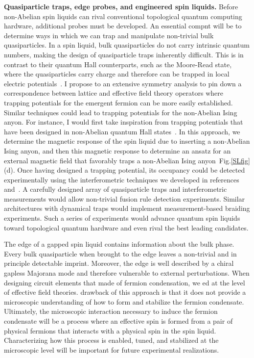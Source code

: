 \hfill \break
{\large \textbf{Quasiparticle traps, edge probes, and engineered spin liquids.}}
Before non-Abelian spin liquids can rival conventional topological quantum computing hardware, additional probes must be developed.
An essential compnt will be to determine ways in which we can trap and manipulate non-trivial bulk quasiparticles.
In a spin liquid, bulk quasiparticles do not carry intrinsic quantum numbers, 
making the design of quasiparticle traps inherently difficult. 
This is in contrast to their quantum Hall counterparts, such as the Moore-Read state, where the quasiparticles carry charge and therefore can be trapped in local electric potentials~\cite{Sarma2005,Bonderson2006}. 
I propose to  an extensive symmetry analysis to pin down a correspondence between lattice and effective field theory operators where trapping potentials for the emergent fermion can be more easily established.
Similar techniques could  lead to trapping potentials for the non-Abelian Ising anyon.
For instance, I would first take inspiration from trapping potentials that have been designed in non-Abelian quantum Hall states~\cite{Mong2017}. 
In this approach, we determine the magnetic response of the spin liquid due to inserting a non-Abelian Ising anyon, and then  this magnetic response to determine an ansatz for an external magnetic field that favorably traps a non-Abelian Ising anyon~Fig.\ref{SLfig}(d).
{Once having designed a trapping potential, its occupancy could be detected experimentally using the interferometric techniques we developed in references~\cite{Aasen20} and~\cite{Klocke2020}. A carefully designed array of quasiparticle traps and interferometric measurements would allow non-trivial fusion rule detection experiments. Similar architectures with dynamical traps would implement measurement-based braiding experiments. Such a series of experiments would advance quantum spin liquids toward topological quantum hardware and  even rival the best leading candidates.
}

The edge of a gapped spin liquid contains information about the bulk phase.
Every bulk quasiparticle when brought to the edge leaves a non-trivial and in principle detectable imprint.
Moreover, the edge is well described by a chiral gapless Majorana mode and therefore vulnerable to external perturbations.
When designing circuit elements that made  of fermion condensation, 
we ed at the level of effective field theories.
 drawback of this approach is that it does not provide a microscopic understanding of how to form and stabilize the fermion condensate.
Ultimately, the microscopic interaction necessary to induce the fermion condensate will be a process where an effective spin is formed from a pair of physical fermions that interacts with a physical spin in the spin liquid.
Characterizing how this process is enabled, 
tuned, and stabilized at the microscopic level will be important for future experimental realizations.

